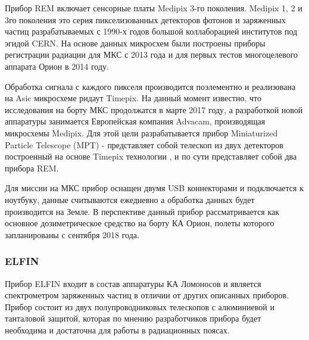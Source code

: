 Прибор REM включает сенсорные платы Medipix 3-го поколения. Medipix 1, 2 и 3го поколения это серия пикселизованных детекторов фотонов и заряженных частиц разрабатываемых с 1990-х годов большой коллаборацией институтов под эгидой CERN. На основе данных микросхем были построены приборы регистрации радиации для МКС с 2013 года и для первых тестов многоцелевого аппарата Орион в 2014 году.

Обработка сигнала с каждого пикселя производится поэлементно и реализована на Asic микросхеме ридаут Timepix. На данный момент известно, что исследования на борту МКС продолжатся в марте 2017 году, а разработкой новой аппаратуры занимается Европейская компания Advacam, производящая микросхемы Medipix. Для этой цели разрабатывается прибор Miniaturized Particle Telescope (MPT)\cite{Fry2016} - представляет собой телескоп из двух детекторов построенный на основе Timepix технологии \cite{Kroupa2015}, и по сути представляет собой два прибора REM. 

Для миссии на МКС прибор оснащен двумя USB коннекторами и подключается к ноутбуку, данные считываются ежедневно а обработка данных будет производится на Земле. В перспективе данный прибор рассматривается как основное дозиметрическое средство на борту КА Орион, полеты которого запланированы с сентября 2018 года.


\subsubsection{ELFIN}
Прибор ELFIN входит в состав аппаратуры КА Ломоносов и является спектрометром заряженных частиц в отличии от других описанных приборов. Прибор состоит из двух полупроводниковых телескопов с алюминиевой и танталовой защитой, которая по мнению разработчиков прибора будет необходима и достаточна для работы в радиационных поясах\cite{VassilisAngelopoulos}.


